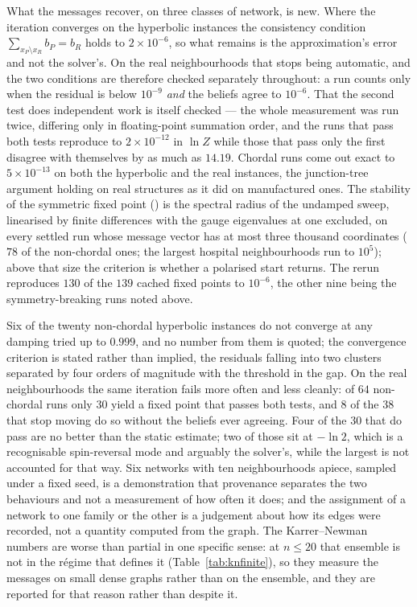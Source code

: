 What the messages recover, on three classes of network, is new. Where the
iteration converges on the hyperbolic instances the consistency condition
$\sum_{x_{P}\setminus x_{R}}b_{P}=b_{R}$ holds to $2\times10^{-6}$, so what
remains is the approximation's error and not the solver's. On the real
neighbourhoods that stops being automatic, and the two conditions are therefore
checked separately throughout: a run counts only when the residual is below
$10^{-9}$ \emph{and} the beliefs agree to $10^{-6}$. That the second test does
independent work is itself checked --- the whole measurement was run twice,
differing only in floating-point summation order, and the runs that pass both
tests reproduce to $2\times10^{-12}$ in $\ln Z$ while those that pass only the
first disagree with themselves by as much as $14.19$. Chordal runs come out
exact to $5\times10^{-13}$ on both the hyperbolic and the real instances, the
junction-tree argument holding on real structures as it did on manufactured
ones. The stability of the symmetric fixed point
() is the spectral radius of the undamped sweep,
linearised by finite differences with the gauge eigenvalues at one
excluded, on every settled run whose message vector has at most three
thousand coordinates ($78$ of the non-chordal ones; the largest hospital
neighbourhoods run to $10^{5}$); above that size the criterion is whether
a polarised start returns. The rerun reproduces $130$ of the $139$ cached
fixed points to $10^{-6}$, the other nine being the symmetry-breaking runs
noted above.

Six of the twenty non-chordal hyperbolic instances do not converge at any
damping tried up to $0.999$, and no number from them is quoted; the convergence
criterion is stated rather than implied, the residuals falling into two clusters
separated by four orders of magnitude with the threshold in the gap. On the real
neighbourhoods the same iteration fails more often and less cleanly: of $64$
non-chordal runs only $30$ yield a fixed point that passes both tests, and $8$
of the $38$ that stop moving do so without the beliefs ever agreeing. Four of
the $30$ that do pass are no better than the static estimate; two of those sit
at $-\ln 2$, which is a recognisable spin-reversal mode and arguably the
solver's, while the largest is not accounted for that way. Six networks with ten
neighbourhoods apiece, sampled under a fixed seed, is a demonstration that
provenance separates the two behaviours and not a measurement of how often it
does; and the assignment of a network to one family or the other is a judgement
about how its edges were recorded, not a quantity computed from the graph. The
Karrer--Newman numbers are worse than partial in one specific sense: at $n\le20$
that ensemble is not in the r\'egime that defines it (Table~\ref{tab:knfinite}),
so they measure the messages on small dense graphs rather than on the ensemble,
and they are reported for that reason rather than despite it.
